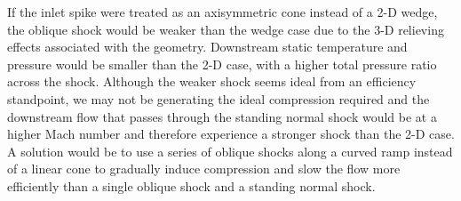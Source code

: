 \documentclass[../main.tex]{subfiles}
\begin{document}
\discussion{}
If the inlet spike were treated as an axisymmetric cone instead of a 2-D wedge, the oblique shock would be weaker than the wedge case due to the 3-D relieving effects associated with the geometry.
Downstream static temperature and pressure would be smaller than the 2-D case, with a higher total pressure ratio across the shock. 
Although the weaker shock seems ideal from an efficiency standpoint, we may not be generating the ideal compression required and the downstream flow that passes through the standing normal shock would be at a higher Mach number and therefore experience a stronger shock than the 2-D case.
A solution would be to use a series of oblique shocks along a curved ramp instead of a linear cone to gradually induce compression and slow the flow more efficiently than a single oblique shock and a standing normal shock.
\end{document}
